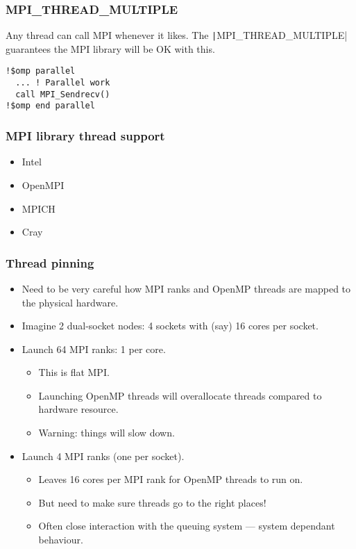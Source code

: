\documentclass{beamer}
\begin{document}
\begin{frame}[fragile]
\frametitle{MPI\_THREAD\_MULTIPLE}
Any thread can call MPI whenever it likes. The \texttt|MPI_THREAD_MULTIPLE| guarantees the MPI library will be OK with this.
\begin{verbatim}
!$omp parallel
  ... ! Parallel work
  call MPI_Sendrecv()
!$omp end parallel
\end{verbatim}
\end{frame}

\begin{frame}
\frametitle{MPI library thread support}
\begin{itemize}
  \item Intel
  \item OpenMPI
  \item MPICH
  \item Cray
\end{itemize}
\end{frame}

\begin{frame}
\frametitle{Thread pinning}
\begin{itemize}
  \item Need to be very careful how MPI ranks and OpenMP threads are mapped to the physical hardware.
  \item Imagine 2 dual-socket nodes: 4 sockets with (say) 16 cores per socket.
  \item Launch 64 MPI ranks: 1 per core.
    \begin{itemize}
      \item This is flat MPI.
      \item Launching OpenMP threads will overallocate threads compared to hardware resource.
      \item Warning: things will slow down.
    \end{itemize}
  \item Launch 4 MPI ranks (one per socket).
    \begin{itemize}
      \item Leaves 16 cores per MPI rank for OpenMP threads to run on.
      \item But need to make sure threads go to the right places!
      \item Often close interaction with the queuing system --- system dependant behaviour.
    \end{itemize}
\end{itemize}
\end{frame}
\end{document}
